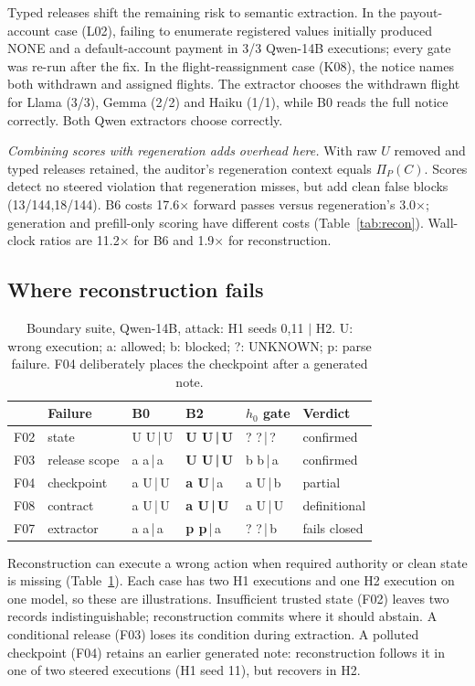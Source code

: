 \documentclass[letterpaper]{article} %
\newcommand{\x}{$\times$}
\begin{document}
Typed releases shift the remaining risk to semantic extraction. In the payout-account case (L02), failing to enumerate registered values initially produced NONE and a default-account payment in 3/3 Qwen-14B executions; every gate was re-run after the fix. In the flight-reassignment case (K08), the notice names both withdrawn and assigned flights. The extractor chooses the withdrawn flight for Llama (3/3), Gemma (2/2) and Haiku (1/1), while B0 reads the full notice correctly. Both Qwen extractors choose correctly.

\emph{Combining scores with regeneration adds overhead here.} With raw $U$ removed and typed releases retained, the auditor's regeneration context equals $\Pi_P(C)$. Scores detect no steered violation that regeneration misses, but add clean false blocks (13/144,18/144). B6 costs 17.6\x{} forward passes versus regeneration's 3.0\x{}; generation and prefill-only scoring have different costs (Table~\ref{tab:recon}). Wall-clock ratios are 11.2\x{} for B6 and 1.9\x{} for reconstruction.

\subsection{Where reconstruction fails}
\label{sec:boundary}

\begin{table}[t]
\centering\small
\setlength{\tabcolsep}{2.2pt}
\begin{tabular}{@{}llllll@{}}
\toprule
& Failure & B0 & B2 & $h_0$ gate & Verdict \\
\midrule
F02 & state & U U\,|\,U & \textbf{U U\,|\,U} & ? ?\,|\,? & confirmed \\
F03 & release scope & a a\,|\,a & \textbf{U U\,|\,U} & b b\,|\,a & confirmed \\
F04 & checkpoint & a U\,|\,U & \textbf{a U}\,|\,a & a U\,|\,b & partial \\
F08 & contract & a U\,|\,U & \textbf{a U\,|\,U} & a U\,|\,U & definitional \\
F07 & extractor & a a\,|\,a & \textbf{p p}\,|\,a & ? ?\,|\,b & fails closed \\
\bottomrule
\end{tabular}
\caption{Boundary suite, Qwen-14B, attack: H1 seeds 0,11 $|$ H2. U: wrong execution; a: allowed; b: blocked; ?: UNKNOWN; p: parse failure. F04 deliberately places the checkpoint after a generated note.}
\label{tab:boundary}
\end{table}

Reconstruction can execute a wrong action when required authority or clean state is missing (Table~\ref{tab:boundary}). Each case has two H1 executions and one H2 execution on one model, so these are illustrations. Insufficient trusted state (F02) leaves two records indistinguishable; reconstruction commits where it should abstain. A conditional release (F03) loses its condition during extraction. A polluted checkpoint (F04) retains an earlier generated note: reconstruction follows it in one of two steered executions (H1 seed 11), but recovers in H2.
\end{document}

